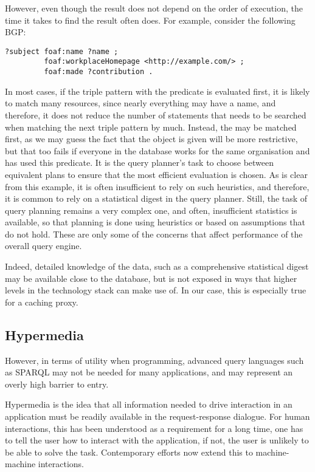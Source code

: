 However, even though the result does not depend on the order of
execution, the time it takes to find the result often does. For
example, consider the following BGP:
\begin{verbatim}
?subject foaf:name ?name ;
         foaf:workplaceHomepage <http://example.com/> ;
         foaf:made ?contribution .
\end{verbatim}
In most cases, if the triple pattern with the 
predicate is evaluated first, it is likely to match many resources,
since nearly everything may have a name, and therefore, it does not
reduce the number of statements that needs to be searched when
matching the next triple pattern by much. Instead, the
 may be matched first, as we may guess
the fact that the object is given will be more restrictive, but that
too fails if everyone in the database works for the same organisation
and has used this predicate. It is the query planner's task to choose
between equivalent plans to ensure that the most efficient evaluation
is chosen. As is clear from this example, it is often insufficient to
rely on such heuristics, and therefore, it is common to rely on a
statistical digest in the query planner. Still, the task of query
planning remains a very complex one, and often, insufficient
statistics is available, so that planning is done using heuristics or
based on assumptions that do not hold. These are only some of the
concerns that affect performance of the overall query engine.

Indeed, detailed knowledge of the data, such as a comprehensive
statistical digest may be available close to the database, but is not
exposed in ways that higher levels in the technology stack can make
use of. In our case, this is especially true for a caching proxy.

\subsection{Hypermedia}

However, in terms of utility when programming, advanced query
languages such as SPARQL may not be needed for many applications, and
may represent an overly high barrier to entry.

Hypermedia is the idea that all information needed to drive
interaction in an application must be readily available in the
request-response dialogue. For human interactions, this has been
understood as a requirement for a long time, one has to tell the user
how to interact with the application, if not, the user is unlikely to
be able to solve the task. Contemporary efforts now extend this to
machine-machine interactions. 

